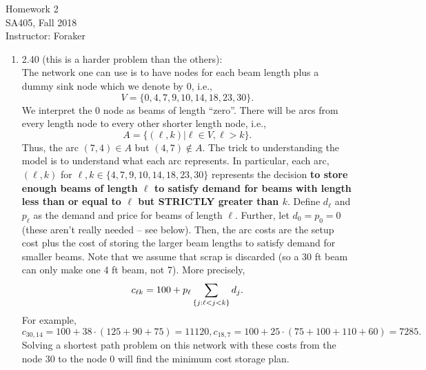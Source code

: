 \documentclass[10pt]{article}
\begin{document}
\begin{center}
  {\sc Homework 2}\\
  {\sc SA405, Fall 2018} \\
  {\sc Instructor: Foraker}
\end{center}

\medskip

\begin{enumerate} 
  \item 2.40 (this is a harder problem than the others):\\
    The network one can use is to have nodes for each beam length plus
    a dummy sink node which we denote by $0$, i.e.,
    \[
    V = \{0,4,7,9,10,14,18,23,30\}.
    \]
    We interpret the $0$ node as beams of length ``zero''. There will be arcs from every length node to every other shorter length node, i.e.,
    \[
    A = \{ (\ell,k) | \ell \in V, \ell > k\}.
    \]
    Thus, the arc $(7,4) \in A$ but $(4,7) \not\in A$. The trick to
    understanding the model is to understand what each arc represents.
    In particular, each arc, $(\ell,k)$ for $\ell, k \in
    \{4,7,9,10,14,18,23,30\}$ represents the decision {\bf to store
      enough beams of length $\ell$ to satisfy demand for beams with 
      length less than or equal to $\ell$ but STRICTLY greater than
      $k$}.
    Define
    $d_\ell$ and $p_\ell$ as the demand and price for beams of length
    $\ell$. Further, let $d_0 = p_0 = 0$ (these aren't really needed
    -- see below). Then, the arc costs are the setup cost plus the
    cost of storing the larger beam lengths to satisfy demand for
    smaller beams. Note that we assume that scrap is discarded (so a
    30 ft beam can only make one 4 ft beam, not 7). More precisely,
    \[
    c_{\ell k} = 100 + p_\ell \sum\limits_{\{j:\ell < j < k\}} d_j.
    \]
    For example,
    \[
    c_{30,14} = 100 + 38 \cdot ( 125 + 90 + 75) = 11120, c_{18,7} = 100 + 25
    \cdot (75 + 100 + 110 + 60) = 7285. 
    \]
    Solving a shortest path problem on this network with these costs
    from the node $30$ to the node $0$ will find the minimum cost
    storage plan.


\end{enumerate}
\end{document}
